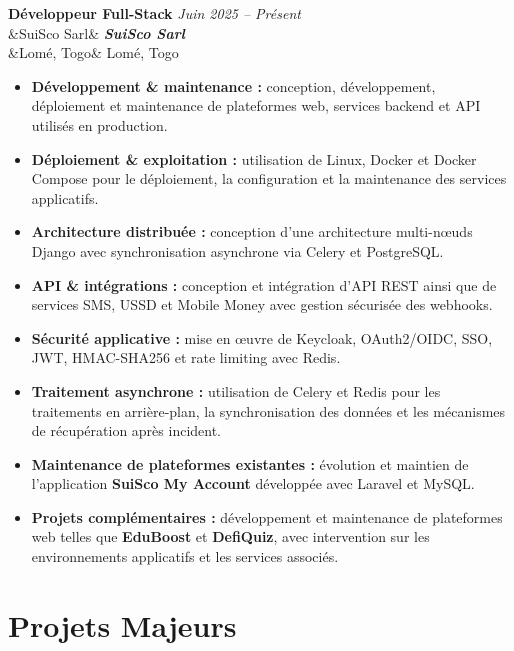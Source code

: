 \documentclass[11pt,a4paper]{article}
\newcommand{\cventry}[4]{%
    \needspace{3\baselineskip}%
    \noindent\textbf{\large #1}
    \hfill
    {\small\color{secondary}\textit{#2}}\\[2pt]%
    \ifx&#3&\else
        \noindent\textbf{\textit{#3}}\\[3pt]%
    \fi
    \ifx&#4&\else
        \noindent #4%
    \fi
    \vspace{6pt}\par
}
\begin{document}
\cventry
{Développeur Full-Stack}
{Juin 2025 -- Présent}
{SuiSco Sarl}
{Lomé, Togo}

\begin{itemize}

    \item \textbf{Développement \& maintenance :}
    conception, développement, déploiement et maintenance de
    plateformes web, services backend et API utilisés en production.

    \item \textbf{Déploiement \& exploitation :}
    utilisation de Linux, Docker et Docker Compose pour le déploiement,
    la configuration et la maintenance des services applicatifs.

    \item \textbf{Architecture distribuée :}
    conception d'une architecture multi-nœuds Django avec
    synchronisation asynchrone via Celery et PostgreSQL.

    \item \textbf{API \& intégrations :}
    conception et intégration d'API REST ainsi que de services
    SMS, USSD et Mobile Money avec gestion sécurisée des webhooks.

    \item \textbf{Sécurité applicative :}
    mise en œuvre de Keycloak, OAuth2/OIDC, SSO, JWT,
    HMAC-SHA256 et rate limiting avec Redis.

    \item \textbf{Traitement asynchrone :}
    utilisation de Celery et Redis pour les traitements en arrière-plan,
    la synchronisation des données et les mécanismes de récupération
    après incident.

    \item \textbf{Maintenance de plateformes existantes :}
    évolution et maintien de l'application \textbf{SuiSco My Account}
    développée avec Laravel et MySQL.

    \item \textbf{Projets complémentaires :}
    développement et maintenance de plateformes web telles que
    \textbf{EduBoost} et \textbf{DefiQuiz}, avec intervention sur
    les environnements applicatifs et les services associés.

\end{itemize}

\section{Projets Majeurs}
\end{document}
